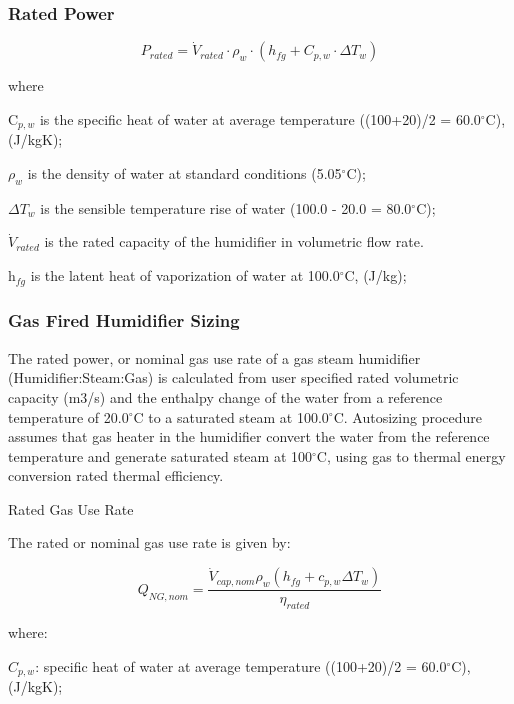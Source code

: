 \subsubsection{Rated Power}\label{rated-power}

\begin{equation}
{P_{rated}} = {\dot V_{rated}} \cdot {\rho_w} \cdot \left( {{h_{fg}} + {C_{p,w}} \cdot \Delta {T_w}} \right)
\end{equation}

where

C\(_{p,w}\) is the specific heat of water at average temperature ((100+20)/2 = 60.0\(^{\circ}\)C), (J/kgK);

\(\rho_{w}\) is the density of water at standard conditions (5.05\(^{\circ}\)C);

\(\Delta T_{w}\) is the sensible temperature rise of water (100.0 - 20.0 = 80.0\(^{\circ}\)C);

\({\dot V_{rated}}\) is the rated capacity of the humidifier in volumetric flow rate.

h\(_{fg}\) is the latent heat of vaporization of water at 100.0\(^{\circ}\)C, (J/kg);

\subsubsection{Gas Fired Humidifier Sizing}\label{gas-fired-humidifier-sizing}

The rated power, or nominal gas use rate of a gas steam humidifier (Humidifier:Steam:Gas) is calculated from user specified rated volumetric capacity (m3/s) and the enthalpy change of the water from a reference temperature of 20.0\(^{\circ}\)C to a saturated steam at 100.0\(^{\circ}\)C. Autosizing procedure assumes that gas heater in the humidifier convert the water from the reference temperature and generate saturated steam at 100\(^{\circ}\)C, using gas to thermal energy conversion rated thermal efficiency.

Rated Gas Use Rate

The rated or nominal gas use rate is given by:

\begin{equation}
Q_{NG,nom} = \frac{\dot{V}_{cap,nom}\rho_w\left(h_{fg}+c_{p,w}\Delta T_w\right)}{\eta_{rated}}
\end{equation}

where:

\(C_{p,w}\): specific heat of water at average temperature ((100+20)/2 = 60.0\(^{\circ}\)C), (J/kgK);

